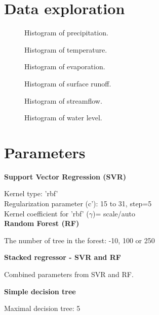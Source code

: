 \section{Data exploration}

  \begin{figure}[H]
  \centering
  
  \caption{Histogram of precipitation.}
  \end{figure}

    \begin{figure}[H]
  \centering
  
  \caption{Histogram of temperature.}
  \end{figure}

    \begin{figure}[H]
  \centering
  
  \caption{Histogram of evaporation.}
  \end{figure}

    \begin{figure}[H]
  \centering
  
  \caption{Histogram of surface runoff.}
  \end{figure}

      \begin{figure}[H]
  \centering
  
  \caption{Histogram of streamflow.}
  \end{figure}

      \begin{figure}[H]
  \centering
  
  \caption{Histogram of water level.}
  \end{figure}

\section{Parameters}
\noindent
\textbf{Support Vector Regression (SVR)}

\noindent
Kernel type: 'rbf' \\
Regularization parameter (c'): 15 to 31, step=5\\
Kernel coefficient for 'rbf' ($\gamma$)= scale/auto\\

\noindent
\textbf{Random Forest (RF)}

\noindent
The number of tree in the forest: -10, 100 or 250

\noindent
\textbf{Stacked regressor - SVR and RF}

\noindent
Combined parameters from SVR and RF.

\noindent
\textbf{Simple decision tree}

\noindent
Maximal decision tree: 5






